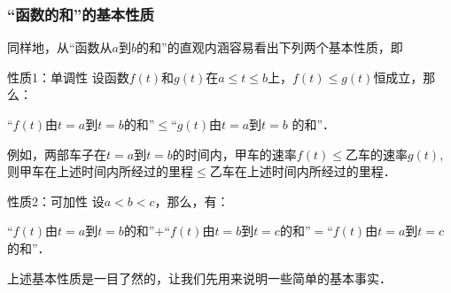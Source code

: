 \subsubsection{{``}函数的和{''}的基本性质}

同样地，从“函数从$a$到$b$的和”的直观内涵容易看出下列两个基本性质，即

\begin{blk}{性质1：单调性}
设函数$f(t)$和$g(t)$在$a\le t\le b$上，$f(t)\le g(t)$恒成立，那么：

“$f(t)$由$t=a$到$t=b$的和”$\le $“$g(t)$由$t=a$到$t=b$
的和”．
\end{blk}

例如，两部车子在$t=a$到$t=b$的时间内，甲车的速率$f(t)\le $乙车的速率$g(t)$, 则甲车在上述时间内所经过的里程$\le $乙车在上述时间内所经过的里程．

\begin{blk}{性质2：可加性}
设$a<b<c$，那么，有：

“$f(t)$由$t=a$到$t=b$的和”$+$“$f(t)$由$t=b$到$t=c$的和”$=$“$f(t)$由$t=a$到$t=c$的和”．
\end{blk}

上述基本性质是一目了然的，让我们先用来说明一些简单的基本事实．

